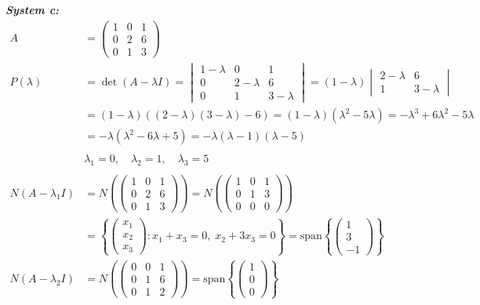 \documentclass{article}
\begin{document}
\newpage
\noindent\textbf{\textit{System c:}}
\begin{align*}
    A &= \begin{pmatrix} 1 & 0 & 1 \\ 0 & 2 & 6 \\ 0 & 1 & 3 \end{pmatrix} \\
    P(\lambda) &= \det(A - \lambda I) = \begin{vmatrix} 1 - \lambda & 0 & 1 \\ 0 & 2 - \lambda & 6 \\ 0 & 1 & 3 - \lambda \end{vmatrix}
    = (1 - \lambda) \begin{vmatrix} 2 - \lambda & 6 \\ 1 & 3 - \lambda \end{vmatrix} \\
    &= (1 - \lambda)((2 - \lambda)(3 - \lambda) - 6) = (1 - \lambda)(\lambda^2 - 5\lambda) = -\lambda^3 + 6\lambda^2 - 5\lambda \\
    &= -\lambda(\lambda^2 - 6\lambda + 5) = -\lambda(\lambda - 1)(\lambda - 5) \\
    \\
    &\lambda_1 = 0, \quad \lambda_2 = 1, \quad \lambda_3 = 5 \\
    \\
    N(A - \lambda_1 I) &= N\left(\begin{pmatrix} 1 & 0 & 1 \\ 0 & 2 & 6 \\ 0 & 1 & 3 \end{pmatrix}\right) = N\left(\begin{pmatrix} 1 & 0 & 1 \\ 0 & 1 & 3 \\ 0 & 0 & 0 \end{pmatrix}\right) \\
    &= \left\{ \begin{pmatrix} x_1 \\ x_2 \\ x_3 \end{pmatrix} : x_1 + x_3 = 0, \; x_2 + 3x_3 = 0 \right\}
    = \text{span}\left\{ \begin{pmatrix} 1 \\ 3 \\ -1 \end{pmatrix} \right\} \\
    N(A - \lambda_2 I) &= N\left(\begin{pmatrix} 0 & 0 & 1 \\ 0 & 1 & 6 \\ 0 & 1 & 2 \end{pmatrix}\right) = \text{span}\left\{ \begin{pmatrix} 1 \\ 0 \\ 0 \end{pmatrix} \right\} \\

\end{align*}
\end{document}
